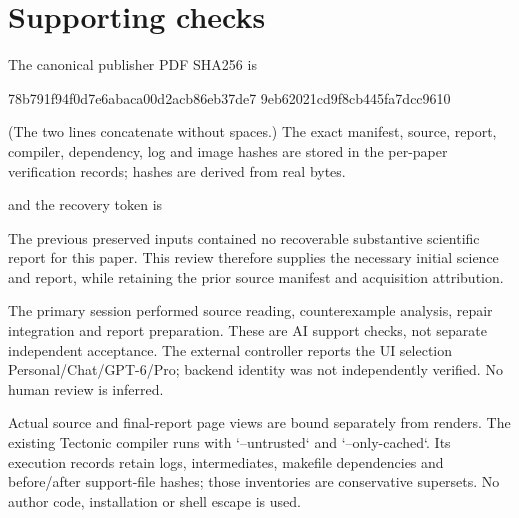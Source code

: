 \documentclass[10pt]{article}
\begin{document}
\section*{Supporting checks}
The canonical publisher PDF SHA256 is\par
78b791f94f0d7e6abaca00d2acb86eb37de7
9eb62021cd9f8cb445fa7dcc9610\par
(The two lines concatenate without spaces.) The exact manifest, source, report, compiler, dependency, log and image hashes are stored in the per-paper verification records; hashes are derived from real bytes.\par
and the recovery token is\par
The previous preserved inputs contained no recoverable substantive scientific report for this paper. This review therefore supplies the necessary initial science and report, while retaining the prior source manifest and acquisition attribution.\par
The primary session performed source reading, counterexample analysis, repair integration and report preparation. These are AI support checks, not separate independent acceptance. The external controller reports the UI selection Personal/Chat/GPT-6/Pro; backend identity was not independently verified. No human review is inferred.\par
Actual source and final-report page views are bound separately from renders. The existing Tectonic compiler runs with `–untrusted` and `–only-cached`. Its execution records retain logs, intermediates, makefile dependencies and before/after support-file hashes; those inventories are conservative supersets. No author code, installation or shell escape is used.\par
\end{document}
